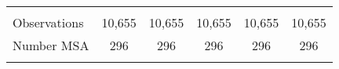 \begin{tabular}{lccccc}
    \vspace{4pt} & \begin{footnotesize}\end{footnotesize} & \begin{footnotesize}\end{footnotesize} & \begin{footnotesize}\end{footnotesize} & \begin{footnotesize}\end{footnotesize} & \begin{footnotesize}\end{footnotesize} \\
    Observations & 10,655 & 10,655 & 10,655 & 10,655 & 10,655 \\
    Number MSA & 296 & 296 & 296 & 296 & 296 \\
    \vspace{-2pt} & \vspace{-2pt} & \vspace{-2pt} & \vspace{-2pt} & \vspace{-2pt} \\ \hline
    
    \end{tabular}
    